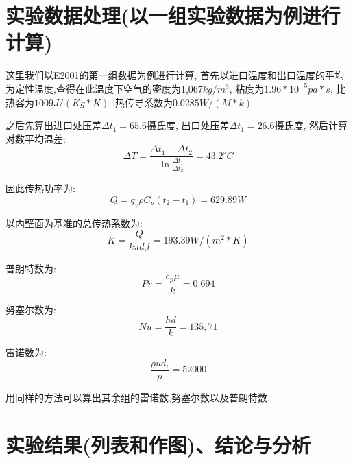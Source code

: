 \documentclass[a4paper,UTF8]{ctexrep}
\theoremstyle{plain}
\theoremstyle{definition}
\numberwithin{equation}{chapter}
\begin{document}
        \section{实验数据处理(以一组实验数据为例进行计算)}
        这里我们以E2001的第一组数据为例进行计算, 首先以进口温度和出口温度的平均为定性温度,查得在此温度下空气的密度为1,067$kg/m^3$, 粘度为$1.96*10^{-5}pa*s$, 比热容为$1009J/(Kg*K)$ ,热传导系数为$0.0285W/(M*k)$

        之后先算出进口处压差$\Delta t_1=65.6$摄氏度, 出口处压差$\Delta t_1=26.6$摄氏度, 然后计算对数平均温差:
$$\Delta T = \frac{\Delta t_1-\Delta t_{2}}{\ln\frac{\Delta t_1}{\Delta t_2}}=43.2^\circ C$$

因此传热功率为:
$$Q=q_v\rho C_p (t_2 -t_1)=629.89W$$

以内壁面为基准的总传热系数为:
$$K=\frac{Q}{k\pi d_i l}=193.39W/(m^2*K)$$

普朗特数为:
$$Pr=\frac{c_p \mu}{k}=0.694$$

努塞尔数为:
$$Nu=\frac{hd}{k}=135,71$$

雷诺数为:
$$\frac{\rho u d_i}{\mu}=52000$$

用同样的方法可以算出其余组的雷诺数,努塞尔数以及普朗特数.

        
        
        \section{实验结果(列表和作图)、结论与分析}
\end{document}
